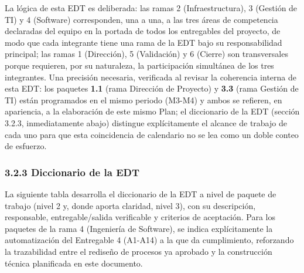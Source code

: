 \documentclass[11pt,a4paper]{article}
\begin{document}
La lógica de esta EDT es deliberada: las ramas 2 (Infraestructura), 3 (Gestión de TI) y 4 (Software) corresponden, una a una, a las tres áreas de competencia declaradas del equipo en la portada de todos los entregables del proyecto, de modo que cada integrante tiene una rama de la EDT bajo su responsabilidad principal; las ramas 1 (Dirección), 5 (Validación) y 6 (Cierre) son transversales porque requieren, por su naturaleza, la participación simultánea de los tres integrantes. Una precisión necesaria, verificada al revisar la coherencia interna de esta EDT: los paquetes \textbf{1.1} (rama Dirección de Proyecto) y \textbf{3.3} (rama Gestión de TI) están programados en el mismo periodo (M3-M4) y ambos se refieren, en apariencia, a la elaboración de este mismo Plan; el diccionario de la EDT (sección 3.2.3, inmediatamente abajo) distingue explícitamente el alcance de trabajo de cada uno para que esta coincidencia de calendario no se lea como un doble conteo de esfuerzo.

\subsubsection{3.2.3 Diccionario de la EDT}\label{diccionario-de-la-edt}

La siguiente tabla desarrolla el diccionario de la EDT a nivel de paquete de trabajo (nivel 2 y, donde aporta claridad, nivel 3), con su descripción, responsable, entregable/salida verificable y criterios de aceptación. Para los paquetes de la rama 4 (Ingeniería de Software), se indica explícitamente la automatización del Entregable 4 (A1-A14) a la que da cumplimiento, reforzando la trazabilidad entre el rediseño de procesos ya aprobado y la construcción técnica planificada en este documento.
\end{document}
